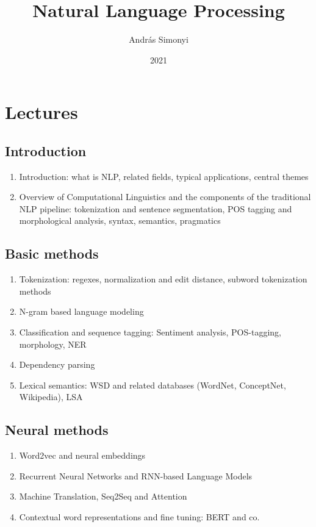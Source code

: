\documentclass[10pt, a4paper]{article}
\author{András Simonyi}
\date{2021}
\title{Natural Language Processing}
\begin{document}
\maketitle
\section*{Lectures}
\subsection*{Introduction}
\begin{enumerate}
\item Introduction: what is NLP, related fields, typical applications, central
  themes
\item Overview of Computational Linguistics and the components of the
  traditional NLP pipeline: tokenization and sentence segmentation, POS tagging
  and morphological analysis, syntax, semantics, pragmatics
\end{enumerate}
\subsection*{Basic methods}
\begin{enumerate}
\item Tokenization: regexes, normalization and edit distance, subword
  tokenization methods
\item N-gram based language modeling
\item Classification and sequence tagging: Sentiment analysis,
POS-tagging, morphology, NER
\item Dependency parsing
\item Lexical semantics: WSD and related databases (WordNet,
ConceptNet, Wikipedia), LSA
\end{enumerate}
\subsection*{Neural methods}
\begin{enumerate}
\item Word2vec and neural embeddings
\item Recurrent Neural Networks and RNN-based Language Models
\item Machine Translation, Seq2Seq and Attention
\item Contextual word representations and fine tuning: BERT and co.
\end{enumerate}
\end{document}
